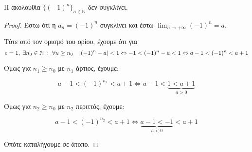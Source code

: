 \begin{mybox3}
  \begin{prop}
    Η ακολουθία $ \{ (-1)^{n} \}_{n \in \mathbb{N}} $ δεν συγκλίνει.
  \end{prop}
\end{mybox3}

\begin{proof}
\item {}
  Έστω ότι η $ a_{n}= (-1)^{n} $ συγκλίνει και έστω $ \lim_{n \to +
  \infty}(-1)^{n} = a $. 

  Τότε από τον ορισμό του ορίου, έχουμε ότι για 
  \[ 
    \varepsilon = 1, \; \exists n_{0} \in \mathbb{N} \; : \; \forall 
    n \geq n_{0} \quad \abs{(-1)^{n}-a} < 1 \Leftrightarrow -1 < 
    (-1)^{n} -a < 1 \Leftrightarrow a-1 < (-1)^{n} < a+1
  \]

  Όμως για $ n_{1} \geq n_{0} $ με $ n_{1} $ άρτιος, έχουμε:

  \[
    a-1 <  (-1)^{n_{1}} < a+1 \Leftrightarrow a-1 < 
    \underbrace{1 < a+1}_{a>0} 
  \] 

  Όμως για $ n_{2} \geq n_{0} $ με $ n_{2} $ περιττός, έχουμε:

  \[
    a-1 <  (-1)^{n_{2}} < a+1 \Leftrightarrow 
    \underbrace{a-1 < -1}_{a<0} < a+1
  \] 

  Οπότε καταλήγουμε σε άτοπο.
\end{proof}


